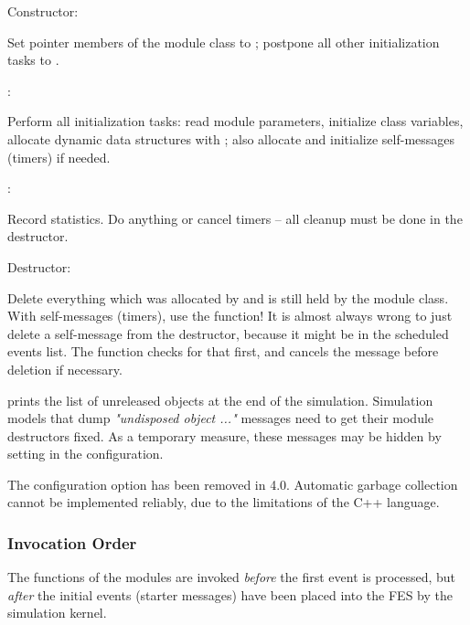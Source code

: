 \begin{description}

\item Constructor:

Set pointer members of the module class to ; postpone all other
initialization tasks to .

\item {}:

Perform all initialization tasks: read module parameters, initialize
class variables, allocate dynamic data structures with ;
also allocate and initialize self-messages (timers) if needed.

\item {}:

Record statistics. Do   anything or cancel timers --
all cleanup must be done in the destructor.

\item Destructor:

Delete everything which was allocated by  and is still held
by the module class. With self-messages (timers), use the
 function! It is almost always wrong
to just delete a self-message from the destructor, because it might be
in the scheduled events list. The  function
checks for that first, and cancels the message before deletion if necessary.

\end{description}

{\opp} prints the list of unreleased objects at the end of the simulation.
Simulation models that dump \textit{"undisposed object ..."} messages need
to get their module destructors fixed. As a temporary measure, these
messages may be hidden by setting  in the
configuration.

\begin{note}
    The  configuration option has been removed in {\opp} 4.0.
    Automatic garbage collection cannot be implemented reliably, due to the
    limitations of the C++ language.
\end{note}


\subsubsection{Invocation Order}

The  functions of the modules are invoked \textit{before}
the first event is processed, but \textit{after} the initial events (starter
messages) have been placed into the FES by
the simulation kernel.

